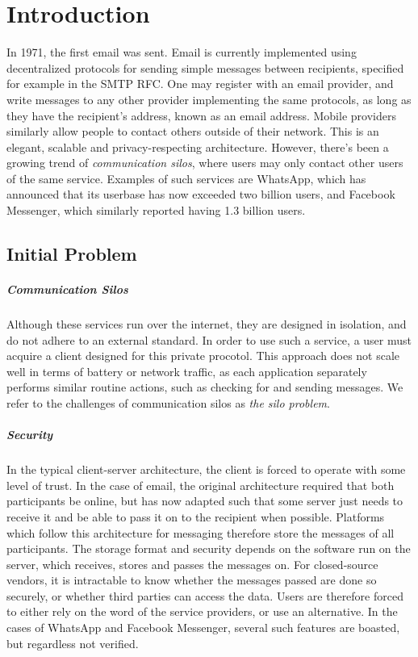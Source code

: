 \chapter{Introduction}
In 1971, the first email was sent\cite{tomlinson2009first}.
Email is currently implemented using decentralized protocols for sending simple messages between recipients, specified for example in the SMTP RFC\cite{RFC5321}.
One may register with an email provider, and write messages to any other provider implementing the same protocols, as long as they have the recipient's address, known as an email address.
Mobile providers similarly allow people to contact others outside of their network.
This is an elegant, scalable and privacy-respecting architecture.
However, there's been a growing trend of \textit{communication silos}, where users may only contact other users of the same service.
Examples of such services are WhatsApp, which has announced that its userbase has now exceeded two billion users\cite{whatsapp_2b_users_archive_org}, and Facebook Messenger, which similarly reported having 1.3 billion users\cite{messenger_1pt3b_users}.

\section{Initial Problem}\label{subsec:initial_problem_statement}
\paragraph{Communication Silos}
Although these services run over the internet, they are designed in isolation, and do not adhere to an external standard.
In order to use such a service, a user must acquire a client designed for this private procotol.
This approach does not scale well in terms of battery or network traffic, as each application separately performs similar routine actions, such as checking for and sending messages.
We refer to the challenges of communication silos as \textit{the silo problem}.

\paragraph{Security}
In the typical client-server architecture, the client is forced to operate with some level of trust.
In the case of email, the original architecture required that both participants be online, but has now adapted such that some server just needs to receive it and be able to pass it on to the recipient when possible\cite{tomlinson2009first}.
Platforms which follow this architecture for messaging therefore store the messages of all participants.
The storage format and security depends on the software run on the server, which receives, stores and passes the messages on.
For closed-source vendors, it is intractable to know whether the messages passed are done so securely, or whether third parties can access the data.
Users are therefore forced to either rely on the word of the service providers, or use an alternative.
In the cases of WhatsApp and Facebook Messenger, several such features are boasted, but regardless not verified\cite{twitter_comms_protocol_comparison}.

